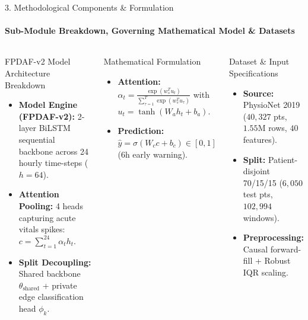 \documentclass[aspectratio=169, 11pt]{beamer}
\begin{document}
\begin{frame}{3. Methodological Components \& Formulation}
    \framesubtitle{Sub-Module Breakdown, Governing Mathematical Model \& Datasets}
    \begin{columns}[T]
        \begin{block}{FPDAF-v2 Model Architecture Breakdown}
            \scriptsize
            \begin{itemize}
                \item \textbf{Model Engine (FPDAF-v2):} 2-layer BiLSTM sequential backbone across 24 hourly time-steps ($h=64$).
                \item \textbf{Attention Pooling:} 4 heads capturing acute vitals spikes: $c = \sum_{t=1}^{24} \alpha_t h_t$.
                \item \textbf{Split Decoupling:} Shared backbone $\theta_{\text{shared}}$ + private edge classification head $\phi_k$.
            \end{itemize}
        \end{block}

        \begin{block}{Mathematical Formulation}
            \scriptsize
            \begin{itemize}
                \item \textbf{Attention:} $\alpha_t = \frac{\exp(w_s^T u_t)}{\sum_{\tau=1}^T \exp(w_s^T u_\tau)}$ with $u_t = \tanh(W_a h_t + b_a)$.
                \item \textbf{Prediction:} $\hat{y} = \sigma(W_c c + b_c) \in [0, 1]$ ($6\text{h}$ early warning).
            \end{itemize}
        \end{block}

        \begin{block}{Dataset \& Input Specifications}
            \scriptsize
            \begin{itemize}
                \item \textbf{Source:} PhysioNet 2019 ($40,327$ pts, $1.55\text{M}$ rows, $40$ features).
                \item \textbf{Split:} Patient-disjoint 70/15/15 ($6,050$ test pts, $102,994$ windows).
                \item \textbf{Preprocessing:} Causal forward-fill + Robust IQR scaling.
            \end{itemize}
        \end{block}


\end{columns}
\end{frame}
\end{document}
